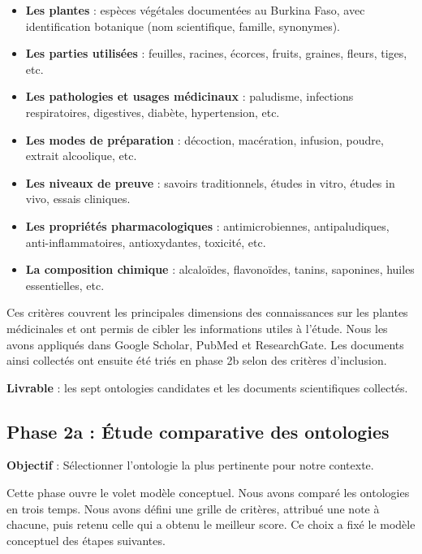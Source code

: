 \begin{itemize}
\item \textbf{Les plantes} : espèces végétales documentées au Burkina Faso, avec identification botanique (nom scientifique, famille, synonymes).
\item \textbf{Les parties utilisées} : feuilles, racines, écorces, fruits, graines, fleurs, tiges, etc.
\item \textbf{Les pathologies et usages médicinaux} : paludisme, infections respiratoires, digestives, diabète, hypertension, etc.
\item \textbf{Les modes de préparation} : décoction, macération, infusion, poudre, extrait alcoolique, etc.
\item \textbf{Les niveaux de preuve} : savoirs traditionnels, études in vitro, études in vivo, essais cliniques.
\item \textbf{Les propriétés pharmacologiques} : antimicrobiennes, antipaludiques, anti-inflammatoires, antioxydantes, toxicité, etc.
\item \textbf{La composition chimique} : alcaloïdes, flavonoïdes, tanins, saponines, huiles essentielles, etc.
\end{itemize}

Ces critères couvrent les principales dimensions des connaissances sur les plantes médicinales et ont permis de cibler les informations utiles à l'étude. Nous les avons appliqués dans Google Scholar, PubMed et ResearchGate. Les documents ainsi collectés ont ensuite été triés en phase 2b selon des critères d'inclusion.

\textbf{Livrable} : les sept ontologies candidates et les documents scientifiques collectés.


\subsection{Phase 2a : Étude comparative des ontologies}
\label{subsec:phase2a}

\textbf{Objectif} : Sélectionner l'ontologie la plus pertinente pour notre contexte.

Cette phase ouvre le volet modèle conceptuel. Nous avons comparé les ontologies en trois temps. Nous avons défini une grille de critères, attribué une note à chacune, puis retenu celle qui a obtenu le meilleur score. Ce choix a fixé le modèle conceptuel des étapes suivantes.

